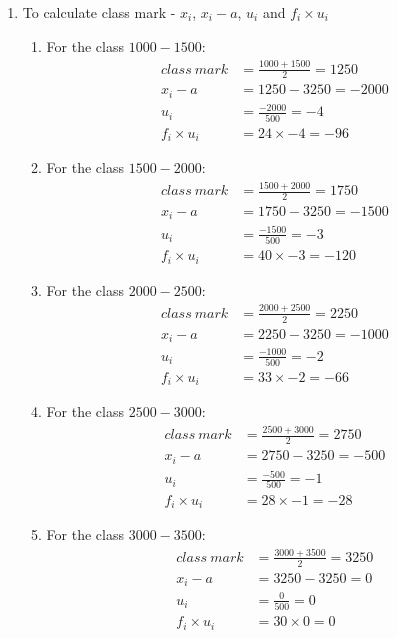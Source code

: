 \begin{enumerate}
\item To calculate class mark - $x_i$, $x_i - a$, $u_i$ and $f_i \times u_i$
\begin{enumerate}

\item For the class $1000-1500$:
\begin{align*}
class\ mark &= \frac{1000+1500}{2} = 1250\\
x_i - a &= 1250-3250 = -2000\\
u_i &= \frac{-2000}{500} = -4 \\
f_i \times u_i &= 24 \times -4 = -96 
\end{align*}

\item For the class $1500-2000$:
\begin{align*}
class\ mark &= \frac{1500+2000}{2} = 1750\\
x_i - a &= 1750-3250 = -1500\\
u_i &= \frac{-1500}{500} = -3\\ 
f_i \times u_i &= 40 \times -3 = -120 
\end{align*}

\item For the class $2000-2500$:
\begin{align*}
class\ mark &= \frac{2000+2500}{2} = 2250\\
x_i - a &= 2250-3250 = -1000\\
u_i &= \frac{-1000}{500} = -2\\ 
f_i \times u_i &= 33 \times -2 = -66 
\end{align*}

\item For the class $2500-3000$:
\begin{align*}
class\ mark &= \frac{2500+3000}{2} = 2750\\
x_i - a &= 2750-3250 = -500\\
u_i &= \frac{-500}{500} = -1\\ 
f_i \times u_i &= 28 \times -1 = -28 
\end{align*}

\item For the class $3000-3500$:
\begin{align*}
class\ mark &= \frac{3000+3500}{2} = 3250\\
x_i - a &= 3250-3250 = 0\\
u_i &= \frac{0}{500} = 0 \\
f_i \times u_i &= 30 \times 0 = 0 
\end{align*}


\end{enumerate}
\end{enumerate}
